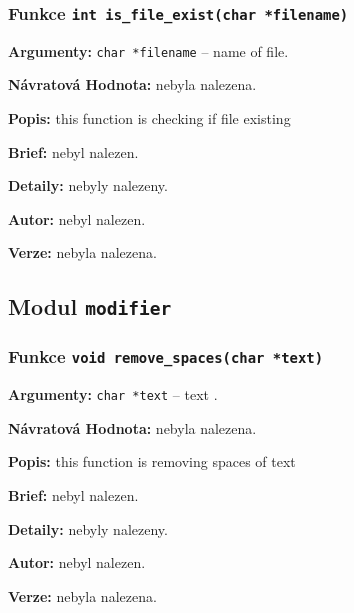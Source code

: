 \documentclass[12pt, a4paper]{article}
\begin{document}
\subsubsection{Funkce \texttt{int is\_file\_exist(char *filename)}}
\textbf{Argumenty: }\verb"char *filename" -- name of file. \\
\par\noindent
\textbf{Návratová Hodnota: }nebyla nalezena.\\
\par\noindent
\textbf{Popis: }this function is checking if file existing\\
\par\noindent
\textbf{Brief: }nebyl nalezen.\\
\par\noindent
\textbf{Detaily: }nebyly nalezeny.\\
\par\noindent
\textbf{Autor: }nebyl nalezen.\\
\par\noindent
\textbf{Verze: }nebyla nalezena.\\
\par\noindent
\subsection{Modul \texttt{modifier}}
\subsubsection{Funkce \texttt{void remove\_spaces(char *text)}}
\textbf{Argumenty: }\verb"char *text" -- text . \\
\par\noindent
\textbf{Návratová Hodnota: }nebyla nalezena.\\
\par\noindent
\textbf{Popis: }this function is removing spaces of text\\
\par\noindent
\textbf{Brief: }nebyl nalezen.\\
\par\noindent
\textbf{Detaily: }nebyly nalezeny.\\
\par\noindent
\textbf{Autor: }nebyl nalezen.\\
\par\noindent
\textbf{Verze: }nebyla nalezena.\\
\par\noindent
\end{document}
